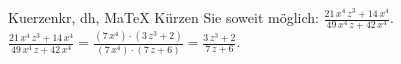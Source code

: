 \begin{MAufgabe}{Kuerzen}{kr, dh, MaTeX}
K\"urzen Sie soweit m\"oglich: $\frac{21\, x^4\, z^3 + 14\, x^4}{49\, x^4\, z + 42\, x^4}$.\\ 
\ifLsg\MLoesung
\quad $\frac{21\, x^4\, z^3 + 14\, x^4}{49\, x^4\, z + 42\, x^4}=\frac{(7\, x^4)\cdot(3\, z^3 + 2)}{(7\, x^4)\cdot(7\, z + 6)}=\frac{3\, z^3 + 2}{7\, z + 6}$.\else\relax\fi
 \end{MAufgabe}